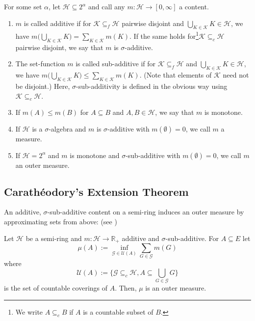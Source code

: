 \documentclass[lean]{Draft}
\newcommand{\docs}[1]{%
\href{https://leanprover-community.github.io/mathlib4_docs/find/?pattern=#1\#doc}
{\texttt{\detokenize{#1}}}}
\begin{document}
\begin{definition}\label{def:content}
  For some set $\alpha$, let $\mathcal H \subseteq 2^\alpha$
  and call any $m : \mathcal H \to [0,\infty]$ a content.
  \begin{enumerate}
  \item $m$ is called additive if for $\mathcal K \subseteq_f \mathcal H$ pairwise disjoint and $\bigcup_{K \in \mathcal K} K \in \mathcal H$, we have $m \Big(\bigcup_{K \in \mathcal K} K \Big) = \sum_{K \in \mathcal K} m(K)$. If the same holds for\footnote {We write $A \subseteq_c B$ if $A$ is a countable subset of $B$.}$\mathcal K \subseteq_c \mathcal H$ pairwise disjoint, we say that $m$ is $\sigma$-additive.
  \item The set-function $m$ is called sub-additive if for $\mathcal K \subseteq_f \mathcal H$ and $\bigcup_{K \in \mathcal K} K \in \mathcal H$, we have $m \Big(\bigcup_{K \in \mathcal K} K \Big) \leq \sum_{K \in \mathcal K} m(K)$. (Note that elements of $\mathcal K$ need not be disjoint.) Here, $\sigma$-sub-additivity is defined in the obvious way using $\mathcal K\subseteq_c \mathcal H$.
  \item If $m(A) \leq m(B)$ for $A\subseteq B$ and $A,B\in\mathcal H$, we say that $m$ is monotone.
  \item If $\mathcal H$ is a $\sigma$-algebra and $m$ is $\sigma$-additive with $m(\emptyset) = 0$, we call
    $m$ a measure.
  \item If $\mathcal H = 2^\alpha$ and $m$ is monotone and $\sigma$-sub-additive with $m(\emptyset)=0$, we call $m$ an outer measure.
  \end{enumerate}
\end{definition}

\subsection{Carathéodory's Extension Theorem}
An additive, $\sigma$-sub-additive content on a semi-ring induces an outer measure by approximating sets from above: (see \docs{inducedOuterMeasure_eq})
\begin{proposition} %
  Let \label{P:auss} $\mathcal H$ be a semi-ring and $m: \mathcal H\to\mathbb R_+$ additive and $\sigma$-sub-additive. For $A\subseteq E$ let
  $$ \mu(A) := \inf_{\mathcal G \in \mathcal U(A)} \sum_{G\in\mathcal G} m(G)$$ where
  $$ \mathcal U(A) := \big\{\mathcal G \subseteq_c \mathcal H, A\subseteq \bigcup_{G\in\mathcal G} G\big\}$$
  is the set of countable coverings of $A$. Then, $\mu$ is an outer measure.
\end{proposition}
\end{document}
